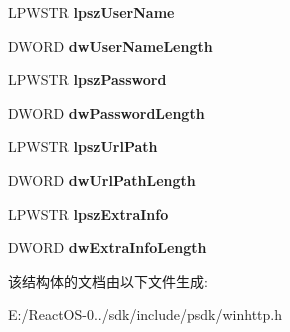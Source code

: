 \begin{DoxyCompactItemize}
L\+P\+W\+S\+TR {\bfseries lpsz\+User\+Name}
\item 
\mbox{\label{struct_u_r_l___c_o_m_p_o_n_e_n_t_s_aef2ed2893f421cedf914429d294acf3c}} 
D\+W\+O\+RD {\bfseries dw\+User\+Name\+Length}
\item 
\mbox{\label{struct_u_r_l___c_o_m_p_o_n_e_n_t_s_ac53a64296f87f835abbd5e04ba1cd44e}} 
L\+P\+W\+S\+TR {\bfseries lpsz\+Password}
\item 
\mbox{\label{struct_u_r_l___c_o_m_p_o_n_e_n_t_s_a4a13a7e19ca008e0dad70afcf82fd924}} 
D\+W\+O\+RD {\bfseries dw\+Password\+Length}
\item 
\mbox{\label{struct_u_r_l___c_o_m_p_o_n_e_n_t_s_a5c6050adfd76033f201a523dad7a5ac2}} 
L\+P\+W\+S\+TR {\bfseries lpsz\+Url\+Path}
\item 
\mbox{\label{struct_u_r_l___c_o_m_p_o_n_e_n_t_s_a9bd035c04970aa2d00f23dd73e97b2ba}} 
D\+W\+O\+RD {\bfseries dw\+Url\+Path\+Length}
\item 
\mbox{\label{struct_u_r_l___c_o_m_p_o_n_e_n_t_s_a3f7bfd535c08979addf4725ebf6b335c}} 
L\+P\+W\+S\+TR {\bfseries lpsz\+Extra\+Info}
\item 
\mbox{\label{struct_u_r_l___c_o_m_p_o_n_e_n_t_s_a897127e8bf1fbe24fc86149102cc5118}} 
D\+W\+O\+RD {\bfseries dw\+Extra\+Info\+Length}
\end{DoxyCompactItemize}


该结构体的文档由以下文件生成\+:\begin{DoxyCompactItemize}
\item 
E\+:/\+React\+O\+S-\/0../sdk/include/psdk/winhttp.\+h\end{DoxyCompactItemize}
